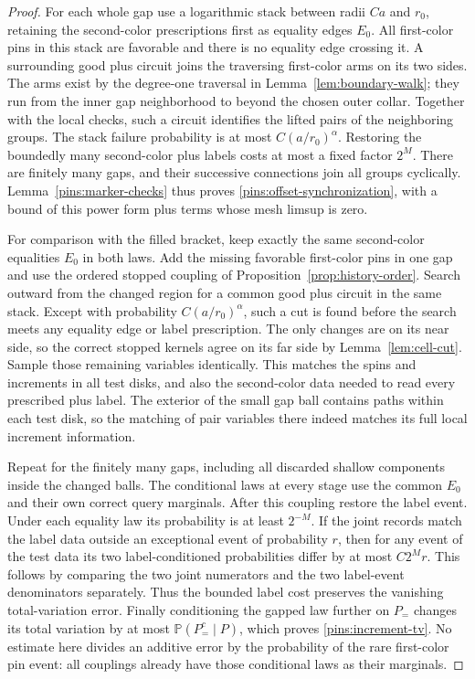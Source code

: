 \documentclass[11pt]{article}
\newcommand{\Prob}{\mathbb P}
\theoremstyle{definition}
\theoremstyle{remark}
\numberwithin{equation}{section}
\begin{document}
\begin{proof}
For each whole gap use a logarithmic stack between radii $Ca$ and
$r_0$, retaining the second-color prescriptions first as equality
edges $E_0$.  All first-color pins in this stack are favorable and
there is no equality edge crossing it.  A surrounding good plus circuit
joins the traversing first-color arms on its two sides.  The arms
exist by the degree-one traversal in Lemma~\ref{lem:boundary-walk};
they run from the inner gap neighborhood to beyond the chosen outer
collar.  Together with the local checks, such a circuit identifies
the lifted pairs of the neighboring groups.  The stack failure
probability is at most $C(a/r_0)^\alpha$.  Restoring the boundedly
many second-color plus labels costs at most a fixed factor $2^M$.
There are finitely many gaps, and their successive connections join
all groups cyclically.  Lemma~\ref{pins:marker-checks} thus proves
\eqref{pins:offset-synchronization}, with a bound of this power form
plus terms whose mesh limsup is zero.

For comparison with the filled bracket, keep exactly the same
second-color equalities $E_0$ in both laws.  Add the missing favorable
first-color pins in one gap and use the ordered stopped coupling of
Proposition~\ref{prop:history-order}.  Search outward from the changed
region for a common good plus circuit in the same stack.  Except
with probability $C(a/r_0)^\alpha$, such a cut is found before the
search meets any equality edge or label prescription.  The only
changes are on its near side, so the correct stopped kernels agree
on its far side by Lemma~\ref{lem:cell-cut}.  Sample those remaining
variables identically.  This matches the spins and increments in all
test disks, and also the second-color data needed to read every
prescribed plus label.  The exterior of the small gap ball contains
paths within each test disk, so the matching of pair variables there
indeed matches its full local increment information.

Repeat for the finitely many gaps, including all discarded shallow
components inside the changed balls.  The conditional laws at every
stage use the common $E_0$ and their own correct query marginals.
After this coupling restore the label event.  Under each equality law
its probability is at least $2^{-M}$.  If the joint records match the
label data outside an exceptional event of probability $r$, then for
any event of the test data its two label-conditioned probabilities
differ by at most $C2^M r$.  This follows by comparing the two joint
numerators and the two label-event denominators separately.  Thus the
bounded label cost preserves the vanishing total-variation error.
Finally conditioning the gapped law further on $P_=$ changes its
total variation by at most $\Prob(P_=^c\mid P)$, which proves
\eqref{pins:increment-tv}.  No estimate here divides an additive
error by the probability of the rare first-color pin event: all
couplings already have those conditional laws as their marginals.


\end{proof}
\end{document}
